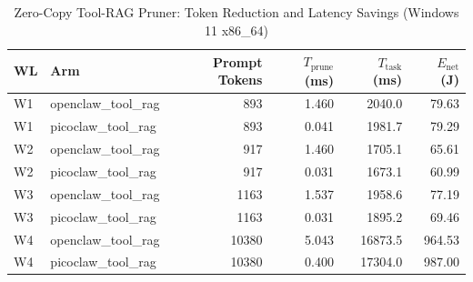 \begin{table}[t]
\centering\small
\caption{Zero-Copy Tool-RAG Pruner: Token Reduction and Latency Savings (Windows 11 x86_64)}
\label{tab:Windows_tool_rag}
\begin{tabular}{llrrrr}
\toprule
WL & Arm & Prompt Tokens & $T_{\text{prune}}$ (ms) & $T_{\text{task}}$ (ms) & $E_{\text{net}}$ (J) \\
\midrule
W1 & openclaw\_tool\_rag & 893 & 1.460 & 2040.0 & 79.63 \\
W1 & picoclaw\_tool\_rag & 893 & 0.041 & 1981.7 & 79.29 \\
W2 & openclaw\_tool\_rag & 917 & 1.460 & 1705.1 & 65.61 \\
W2 & picoclaw\_tool\_rag & 917 & 0.031 & 1673.1 & 60.99 \\
W3 & openclaw\_tool\_rag & 1163 & 1.537 & 1958.6 & 77.19 \\
W3 & picoclaw\_tool\_rag & 1163 & 0.031 & 1895.2 & 69.46 \\
W4 & openclaw\_tool\_rag & 10380 & 5.043 & 16873.5 & 964.53 \\
W4 & picoclaw\_tool\_rag & 10380 & 0.400 & 17304.0 & 987.00 \\
\bottomrule
\end{tabular}
\end{table}
